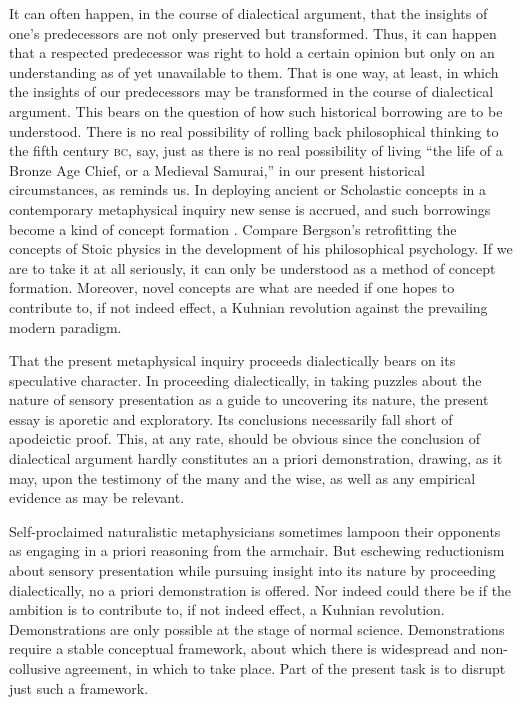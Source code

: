 It can often happen, in the course of dialectical argument, that the insights of one's predecessors are not only preserved but transformed. Thus, it can happen that a respected predecessor was right to hold a certain opinion but only on an understanding as of yet unavailable to them. That is one way, at least, in which the insights of our predecessors may be transformed in the course of dialectical argument. This bears on the question of how such historical borrowing are to be understood. There is no real possibility of rolling back philosophical thinking to the fifth century \textsc{bc}, say, just as there is no real possibility of living ``the life of a Bronze Age Chief, or a Medieval Samurai,'' in our present historical circumstances, as \citet[140]{Williams:1981rt} reminds us. In deploying ancient or Scholastic concepts in a contemporary metaphysical inquiry new sense is accrued, and such borrowings become a kind of concept formation \citep[587--8]{Moore:2012aa}. Compare Bergson's \citeyearpar{Bergson:1912pi} retrofitting the concepts of Stoic physics in the development of his philosophical psychology. If we are to take it at all seriously, it can only be understood as a method of concept formation. Moreover, novel concepts are what are needed if one hopes to contribute to, if not indeed effect, a Kuhnian revolution against the prevailing modern paradigm.

That the present metaphysical inquiry proceeds dialectically bears on its speculative character. In proceeding dialectically, in taking puzzles about the nature of sensory presentation as a guide to uncovering its nature, the present essay is aporetic and exploratory. Its conclusions necessarily fall short of apodeictic proof. This, at any rate, should be obvious since the conclusion of dialectical argument hardly constitutes an a priori demonstration, drawing, as it may, upon the testimony of the many and the wise, as well as any empirical evidence as may be relevant. 

Self-proclaimed naturalistic metaphysicians sometimes lampoon their opponents as engaging in a priori reasoning from the armchair. But eschewing reductionism about sensory presentation while pursuing insight into its nature by proceeding dialectically, no a priori demonstration is offered. Nor indeed could there be if the ambition is to contribute to, if not indeed effect, a Kuhnian revolution. Demonstrations are only possible at the stage of normal science. Demonstrations require a stable conceptual framework, about which there is widespread and non-collusive agreement, in which to take place. Part of the present task is to disrupt just such a framework.

